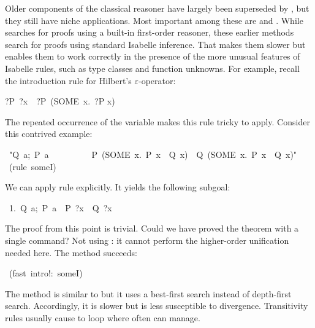 Older components of the classical reasoner have largely been 
superseded by , but they still have niche applications. 
Most important among these are  and . While  
searches for proofs using a built-in first-order reasoner, these 
earlier methods search for proofs using standard Isabelle inference. 
That makes them slower but enables them to work correctly in the 
presence of the more unusual features of Isabelle rules, such 
as type classes and function unknowns. For example, recall the introduction rule
for Hilbert's $\varepsilon$-operator: 
\begin{isabelle}
?P\ ?x\ \isasymLongrightarrow\ ?P\ (SOME\ x.\ ?P x)
\end{isabelle}
%
The repeated occurrence of the variable  makes this rule tricky 
to apply. Consider this contrived example: 
\begin{isabelle}
\ "\isasymlbrakk Q\ a;\ P\ a\isasymrbrakk\isanewline
\ \ \ \ \ \ \ \ \,\isasymLongrightarrow\ P\ (SOME\ x.\ P\ x\ \isasymand\ Q\ x)\
\isasymand\ Q\ (SOME\ x.\ P\ x\ \isasymand\ Q\ x)"\isanewline
{}\ (rule\ someI)
\end{isabelle}
%
We can apply rule  explicitly.  It yields the 
following subgoal: 
\begin{isabelle}
\ 1.\ \isasymlbrakk Q\ a;\ P\ a\isasymrbrakk\ \isasymLongrightarrow\ P\ ?x\
\isasymand\ Q\ ?x%
\end{isabelle}
The proof from this point is trivial.  Could we have
proved the theorem with a single command? Not using : it
cannot perform  the higher-order unification needed here.  The
\isa{fast}\indexbold{*fast (method)} method succeeds: 
\begin{isabelle}
\isacommand{apply}\ (fast\ intro!:\ someI)
\end{isabelle}

The  method is similar to
 but it uses a  best-first search instead of depth-first search.
Accordingly,  it is slower but is less susceptible to divergence.
Transitivity  rules usually cause \isa{fast} to loop where often \isa{best} 
can manage.

